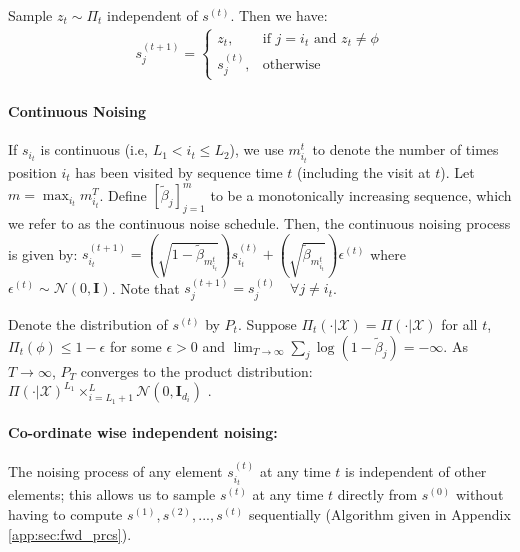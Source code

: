 Sample $z_t \sim \Pi_t$ independent of $s^{(t)}$. Then we have:
\begin{align*}
    s^{(t+1)}_{j} = 
    \begin{cases}
    z_t,& \text{if } j =  i_t \text{  and  } z_t \neq \phi \\
    s^{(t)}_{j},& \text{otherwise }
    \end{cases}
\end{align*}

\paragraph{Continuous Noising}
If $s_{i_t}$ is continuous (i.e, $L_1 < i_t \leq L_2$), we use $m_{i_t}^t$ to denote the number of times position $i_t$ has been visited by sequence time $t$ (including the visit at $t$). Let $m = \max_{i_t} m_{i_t}^T $. Define $[\tilde{\beta}_j]_{j = 1}^{m}$ to be a monotonically increasing sequence, which we refer to as the continuous noise schedule.
Then, the continuous noising process is given by:
$
    s^{(t+1)}_{i_t} = \left(\sqrt{1 - \tilde{\beta}_{m_{i_t}^t}}\right) s^{(t)}_{i_t} + \left(\sqrt{\tilde{\beta}_{m_{i_t}^t}}\right) \epsilon^{(t)}
$
where $\epsilon^{(t)} \sim \mathcal{N}(0, \mathbf{I})$. Note that $s^{(t+1)}_{j} = s^{(t)}_{j} \quad \forall j \neq i_t$.

\begin{lemma}
Denote the distribution of $s^{(t)}$ by $P_t$. Suppose $\Pi_t\left(\cdot | \mathcal{X} \right) = \Pi\left(\cdot | \mathcal{X} \right)$ for all $t$, $\Pi_t(\phi) \leq 1 - \epsilon$ for some $\epsilon > 0$ and $\lim_{T \rightarrow \infty} \sum_{j} \log \left(1- \tilde{\beta}_j\right) = -\infty$. As $T \rightarrow \infty$, $P_T$ converges to the product distribution: $\Pi\left( \cdot| \mathcal{X} \right)^{L_1} \times_{i=L_1 + 1}^{L} \mathcal{N}\left(0, \mathbf{I}_{d_i} \right)$ .
\label{lemma:for_process}
\end{lemma}

\paragraph{Co-ordinate wise independent noising:}

The noising process of any element $s_{i_t}^{(t)}$ at any time $t$ is independent of other elements; this allows us to sample $s^{(t)}$ at any time $t$ directly from $s^{(0)}$ without having to compute $s^{(1)}, s^{(2)}, ..., s^{(t)}$ sequentially (Algorithm given in Appendix \ref{app:sec:fwd_prcs}).

